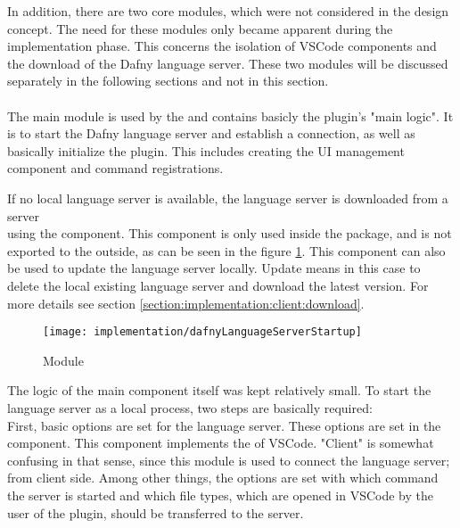 In addition, there are two core modules, which were not considered in the design concept.
The need for these modules only became apparent during the implementation phase.
This concerns the isolation of VSCode components
and the download of the Dafny language server.
These two modules will be discussed separately in the following sections and not in this section. \\

\textbf{}\\
The main module  is used by the 
and contains basicly the plugin's "main logic".
It is to start the Dafny language server and establish a connection,
as well as basically initialize the plugin. This includes creating the UI management component and command registrations.

If no local language server is available, the language server is downloaded from a server \\
using the  component.
This component is only used inside the package, and is not exported to the outside,
as can be seen in the figure \ref{fig:placeholder_ref}.
This component can also be used to update the language server locally.
Update means in this case to delete the local existing language server and download the latest version.
For more details see section \ref{section:implementation:client:download}.

\begin{figure}[H]
    \centering
    \texttt{[image: implementation/dafnyLanguageServerStartup]}
    \caption{Module }
    \label{fig:placeholder_ref}
\end{figure}

The logic of the main component  itself was kept relatively small.
To start the language server as a local process, two steps are basically required:\\

First, basic options are set for the language server.
These options are set in the  component. This component implements the 
of VSCode. "Client" is somewhat confusing in that sense, since this module is used to connect the language server; from client side.
Among other things, the options are set with which command the server is started and which file types, which are opened in VSCode by the user of the plugin, should be transferred to the server. \\


